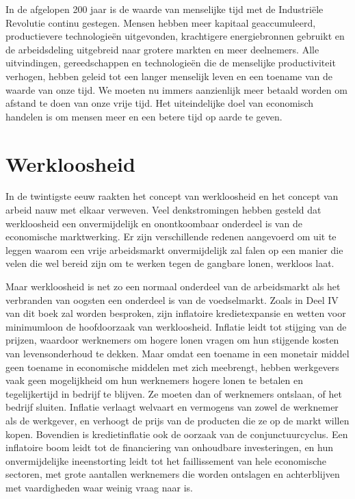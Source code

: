 In de afgelopen 200 jaar is de waarde van
menselijke tijd met de Industriële Revolutie continu gestegen. Mensen hebben meer kapitaal
geaccumuleerd, productievere technologieën uitgevonden, krachtigere
energiebronnen gebruikt en de arbeidsdeling uitgebreid naar grotere
markten en meer deelnemers. Alle uitvindingen, gereedschappen en
technologieën die de menselijke productiviteit verhogen, hebben geleid
tot een langer menselijk leven en een toename van de waarde van onze
tijd. We moeten nu immers aanzienlijk meer betaald worden om afstand te
doen van onze vrije tijd. Het uiteindelijke doel van economisch handelen is om mensen meer en een betere tijd op aarde te geven.

\section{Werkloosheid}

In de twintigste eeuw raakten het concept van werkloosheid en het
concept van arbeid nauw met elkaar verweven. Veel denkstromingen hebben
gesteld dat werkloosheid een onvermijdelijk en onontkoombaar onderdeel
is van de economische marktwerking. Er zijn verschillende redenen
aangevoerd om uit te leggen waarom een vrije arbeidsmarkt onvermijdelijk
zal falen op een manier die velen die wel bereid zijn om te werken tegen
de gangbare lonen, werkloos laat.

Maar werkloosheid is net zo een normaal onderdeel van de arbeidsmarkt
als het verbranden van oogsten een onderdeel is van de voedselmarkt.
Zoals in Deel IV van dit boek zal worden besproken, zijn inflatoire
kredietexpansie en wetten voor minimumloon de hoofdoorzaak van
werkloosheid. Inflatie leidt tot stijging van de prijzen, waardoor
werknemers om hogere lonen vragen om hun stijgende kosten van
levensonderhoud te dekken. Maar omdat een toename in een monetair middel
geen toename in economische middelen met zich meebrengt, hebben
werkgevers vaak geen mogelijkheid om hun werknemers hogere lonen te
betalen en tegelijkertijd in bedrijf te blijven. Ze moeten dan of
werknemers ontslaan, of het bedrijf sluiten. Inflatie verlaagt welvaart
en vermogens van zowel de werknemer als de werkgever, en verhoogt de
prijs van de producten die ze op de markt willen kopen. Bovendien is
kredietinflatie ook de oorzaak van de conjunctuurcyclus. Een inflatoire
boom leidt tot de financiering van onhoudbare investeringen, en hun
onvermijdelijke ineenstorting leidt tot het faillissement van hele
economische sectoren, met grote aantallen werknemers die worden
ontslagen en achterblijven met vaardigheden waar weinig vraag naar is.


